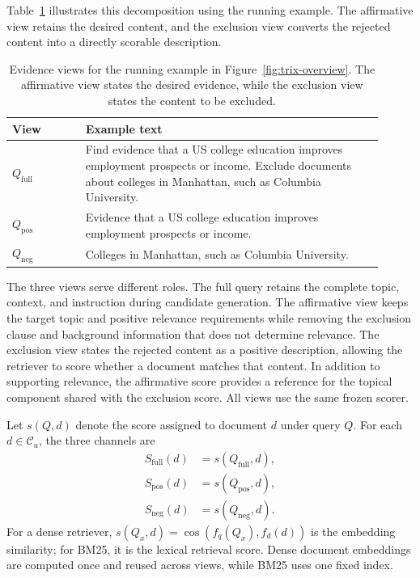 \documentclass[letterpaper]{article}
\newcommand{\qbase}{Q_{\text{full}}}
\newcommand{\qpos}{Q_{\text{pos}}}
\newcommand{\qneg}{Q_{\text{neg}}}
\newcommand{\sbase}{S_{\text{full}}}
\newcommand{\spos}{S_{\text{pos}}}
\newcommand{\sneg}{S_{\text{neg}}}
\begin{document}
Table~\ref{tab:trix-decomposition} illustrates this decomposition using the
running example.  The affirmative view retains the desired content, and the
exclusion view converts the rejected content into a directly scorable
description.

\begin{table}[htbp]
\centering
\small
\setlength{\tabcolsep}{3pt}
\begin{tabular}{p{0.18\linewidth} p{0.73\linewidth}}
\toprule
\textbf{View} & \textbf{Example text} \\
\midrule
$\qbase$ & Find evidence that a US college education improves employment
prospects or income. Exclude documents about colleges in Manhattan, such as
Columbia University. \\
$\qpos$ & Evidence that a US college education improves employment prospects
or income. \\
$\qneg$ & Colleges in Manhattan, such as Columbia University. \\
\bottomrule
\end{tabular}
\caption{Evidence views for the running example in
Figure~\ref{fig:trix-overview}.  The affirmative view states the desired
evidence, while the exclusion view states the content to be excluded.}
\label{tab:trix-decomposition}
\end{table}

The three views serve different roles.  The full query retains the complete
topic, context, and instruction during candidate generation.  The affirmative
view keeps the target topic and positive relevance requirements while removing
the exclusion clause and background information that does not determine
relevance.  The exclusion view states the rejected content as a positive
description, allowing the retriever to score whether a document matches that
content.  In addition to supporting relevance, the affirmative score provides
a reference for the topical component shared with the exclusion score.  All
views use the same frozen scorer.

Let $s(Q,d)$ denote the score assigned to document $d$ under query $Q$.  For
each $d\in\mathcal C_u$, the three channels are
\begin{equation}
\begin{aligned}
 \sbase(d) &= s(\qbase, d), \\
 \spos(d)  &= s(\qpos, d), \\
 \sneg(d)  &= s(\qneg, d).
\end{aligned}
\label{eq:trix-channels}
\end{equation}
For a dense retriever, $s(Q_x,d)=\cos(f_q(Q_x),f_d(d))$ is the embedding
similarity; for BM25, it is the lexical retrieval score.  Dense document
embeddings are computed once and reused across views, while BM25 uses one
fixed index.
\end{document}
